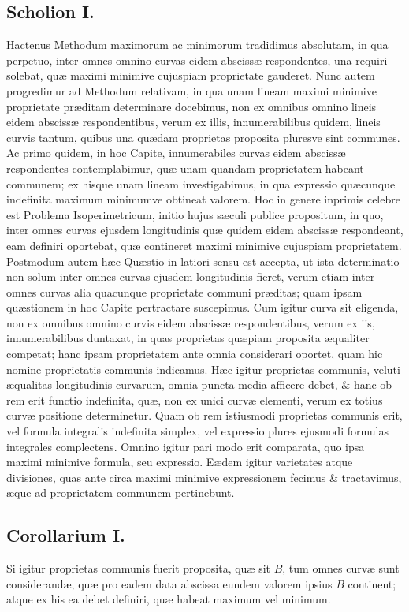 \subsection*{Scholion I.}
Hactenus Methodum maximorum ac minimorum tradidimus absolutam, in qua perpetuo, inter omnes omnino curvas eidem abscissæ respondentes, una requiri solebat, quæ maximi minimive cujuspiam proprietate gauderet. Nunc autem progredimur ad Methodum relativam, in qua unam lineam maximi minimive proprietate præditam determinare docebimus, non ex omnibus omnino lineis eidem abscissæ respondentibus, verum ex illis, innumerabilibus quidem, lineis curvis tantum, quibus una quædam proprietas proposita pluresve sint communes. Ac primo quidem, in hoc Capite, innumerabiles curvas eidem abscissæ respondentes contemplabimur, quæ unam quandam proprietatem habeant communem; ex hisque unam lineam investigabimus, in qua expressio quæcunque indefinita maximum minimumve obtineat valorem. Hoc in genere inprimis celebre est Problema Isoperimetricum, initio hujus sæculi publice propositum, in quo, inter omnes curvas ejusdem longitudinis quæ quidem eidem abscissæ respondeant, eam definiri oportebat, quæ contineret maximi minimive cujuspiam proprietatem. Postmodum autem hæc Quæstio in latiori sensu est accepta, ut ista determinatio non solum inter omnes curvas ejusdem longitudinis fieret, verum etiam inter omnes curvas alia quacunque proprietate communi præditas; quam ipsam quæstionem in hoc Capite pertractare suscepimus. Cum igitur curva sit eligenda, non ex omnibus omnino curvis eidem abscissæ respondentibus, verum ex iis, innumerabilibus duntaxat, in quas proprietas quæpiam proposita æqualiter competat; hanc ipsam proprietatem ante omnia considerari oportet, quam hic nomine proprietatis communis indicamus. Hæc igitur proprietas communis, veluti æqualitas longitudinis curvarum, omnia puncta media afficere debet, \& hanc ob rem erit functio indefinita, quæ, non ex unici curvæ elementi, verum ex totius curvæ positione determinetur. Quam ob rem istiusmodi proprietas communis erit, vel formula integralis indefinita simplex, vel expressio plures ejusmodi formulas integrales complectens. Omnino igitur pari modo erit comparata, quo ipsa maximi minimive formula, seu expressio. Eædem igitur varietates atque divisiones, quas ante circa maximi minimive expressionem fecimus \& tractavimus, æque ad proprietatem communem pertinebunt.

\subsection*{Corollarium I.}
Si igitur proprietas communis fuerit proposita, quæ sit $B$, tum omnes curvæ sunt considerandæ, quæ pro eadem data abscissa eundem valorem ipsius $B$ continent; atque ex his ea debet definiri, quæ habeat maximum vel minimum.

